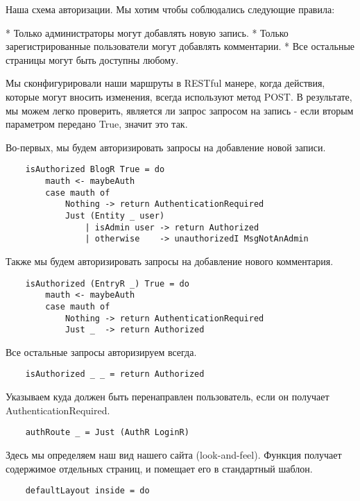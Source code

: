 Наша схема авторизации. Мы хотим чтобы соблюдались следующие правила:

* Только администраторы могут добавлять новую запись. 
* Только зарегистрированные пользователи могут добавлять комментарии. 
* Все остальные страницы могут быть доступны любому.  

Мы сконфигурировали наши маршруты в RESTful манере, когда действия, которые могут вносить изменения, всегда используют метод POST. В результате, мы можем легко проверить, является ли запрос запросом на запись - если вторым параметром передано True, значит это так.

Во-первых, мы будем авторизировать запросы на добавление новой записи. 
 
\begin{lstlisting}
    isAuthorized BlogR True = do
        mauth <- maybeAuth
        case mauth of
            Nothing -> return AuthenticationRequired
            Just (Entity _ user)
                | isAdmin user -> return Authorized
                | otherwise    -> unauthorizedI MsgNotAnAdmin
\end{lstlisting}

Также мы будем авторизировать запросы на добавление нового комментария. 
 
\begin{lstlisting}
    isAuthorized (EntryR _) True = do
        mauth <- maybeAuth
        case mauth of
            Nothing -> return AuthenticationRequired
            Just _  -> return Authorized
\end{lstlisting}
 
Все остальные запросы авторизируем всегда.
 
\begin{lstlisting}
    isAuthorized _ _ = return Authorized
\end{lstlisting}
 
Указываем куда должен быть перенаправлен пользователь, если он получает AuthenticationRequired. 
 
\begin{lstlisting}
    authRoute _ = Just (AuthR LoginR)
\end{lstlisting}
 
Здесь мы определяем наш вид нашего сайта (look-and-feel).  Функция получает содержимое отдельных страниц, и помещает его в стандартный шаблон. 
 
\begin{lstlisting}
    defaultLayout inside = do
\end{lstlisting}
 
